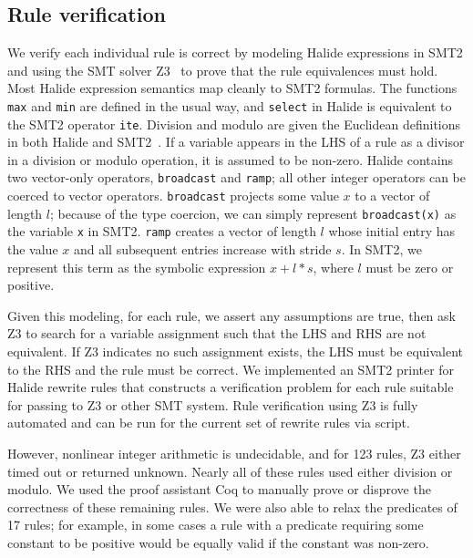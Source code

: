 \documentclass[sigplan,10pt,review,anonymous]{acmart}\settopmatter{printfolios=true,printccs=false,printacmref=false}
\newcommand{\NumPredicatesRelaxed}{{\color{black} 17}\xspace}
\begin{document}
\subsection{Rule verification}

We verify each individual rule is correct by modeling Halide expressions in SMT2
and using the SMT solver Z3~\cite{de2008z3} to prove that the rule equivalences must hold.
Most Halide expression semantics map cleanly
to SMT2 formulas. The functions \texttt{max} and \texttt{min} are defined in
the usual way, and \texttt{select} in Halide is equivalent to the SMT2 operator
\texttt{ite}. Division and modulo are given the Euclidean definitions in both
Halide and SMT2~\cite{boute1992euclidean}. If a variable appears in the LHS of a rule as a divisor in a
division or modulo operation, it is assumed to be non-zero. %
Halide contains two vector-only operators, \texttt{broadcast} and \texttt{ramp}; all
other integer operators can be coerced to vector operators. 
\texttt{broadcast} projects some value $x$ to a vector of length $l$; because of
the type coercion, we can simply represent \texttt{broadcast(x)} as the variable
\texttt{x} in SMT2. \texttt{ramp} creates a vector of length $l$
whose initial entry has the value $x$ and all subsequent entries increase with
stride $s$. In SMT2, we represent this term as the symbolic expression $x + l *
s$, where $l$ must be zero or positive.

Given this modeling, for each rule, we assert any assumptions are true, then
ask Z3 to search for a variable assignment such that the LHS and RHS are not
equivalent.  If Z3 indicates no such assignment exists, the LHS must be equivalent to
the RHS and the rule must be correct. We implemented an SMT2 printer for 
Halide rewrite rules that constructs a verification problem for each rule
suitable for passing to Z3 or other SMT system.  Rule verification using Z3 is fully automated
and can be run for the current set of rewrite rules via script.

However, nonlinear integer arithmetic is undecidable, and for 123
rules, Z3 either timed out or returned unknown. Nearly all of these rules used
either division or modulo. We used the proof assistant Coq to manually prove or
disprove the correctness of these remaining rules. We
were also able to relax the predicates of \NumPredicatesRelaxed rules; for example, in some cases a rule
with a predicate requiring some constant to be positive would be equally valid
if the constant was non-zero.
\end{document}
